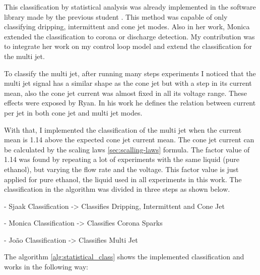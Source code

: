  

This classification by statistical analysis was already implemented in the software library made by the previous student \cite{Monica}.
This method was capable of only classifying dripping, intermittent and cone jet modes. Also in her work, Monica extended the classification to corona or discharge detection.
My contribution was to integrate her work on my control loop model and extend the classification for the multi jet.

To classify the multi jet, after running many steps experiments I noticed that the multi jet signal has a similar shape as the cone jet but with a step in its current mean, also the cone jet current was almost fixed in all its voltage range. 
These effects were exposed by Ryan\cite{Ryan}. In his work he defines the relation between current per jet in both cone jet and multi jet modes.

With that, I implemented the classification of the multi jet when the current mean is 1.14 above the expected cone jet current mean. 
The cone jet current can be calculated by the scaling laws \ref{sec:scalling-laws} formula.
The factor value of 1.14 was found by repeating a lot of experiments with the same liquid (pure ethanol), but varying the flow rate and the voltage. This factor value is just applied for pure ethanol, the liquid used in all experiments in this work.
The classification in the algorithm was divided in three steps as shown below.

        - Sjaak Classification -> Classifies Dripping, Intermittent and Cone Jet
        
        - Monica Classification -> Classifies Corona Sparks

        - João Classification -> Classifies Multi Jet

	The algorithm \ref{alg:statistical_class} shows the implemented classification and works in the following way:

